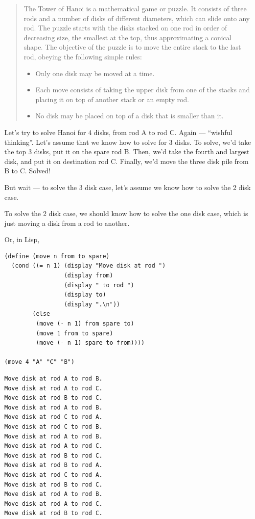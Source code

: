 \documentclass[9pt]{report}
\begin{document}
\begin{quote}
The Tower of Hanoi is a mathematical game or puzzle. It consists of
three rods and a number of disks of different diameters, which can
slide onto any rod. The puzzle starts with the disks stacked on one
rod in order of decreasing size, the smallest at the top, thus
approximating a conical shape. The objective of the puzzle is to
move the entire stack to the last rod, obeying the following simple
rules:

\begin{itemize}
\item Only one disk may be moved at a time.
\item Each move consists of taking the upper disk from one of the
stacks and placing it on top of another stack or an empty rod.
\item No disk may be placed on top of a disk that is smaller than it.
\end{itemize}
\end{quote}

Let's try to solve Hanoi for 4 disks, from rod A to rod C. Again
--- ``wishful thinking''. Let's assume that we know how to solve for
3 disks. To solve, we'd take the top 3 disks, put it on the spare
rod B. Then, we'd take the fourth and largest disk, and put it on
destination rod C. Finally, we'd move the three disk pile from B
to C. Solved!

But wait --- to solve the 3 disk case, let's assume we know how to
solve the 2 disk case.

To solve the 2 disk case, we should know how
to solve the one disk case, which is just moving a disk from a rod
to another.

Or, in Lisp,

\begin{verbatim}
(define (move n from to spare)
  (cond ((= n 1) (display "Move disk at rod ")
                 (display from)
                 (display " to rod ")
                 (display to)
                 (display ".\n"))
        (else
         (move (- n 1) from spare to)
         (move 1 from to spare)
         (move (- n 1) spare to from))))

(move 4 "A" "C" "B")
\end{verbatim}

\begin{verbatim}
Move disk at rod A to rod B.
Move disk at rod A to rod C.
Move disk at rod B to rod C.
Move disk at rod A to rod B.
Move disk at rod C to rod A.
Move disk at rod C to rod B.
Move disk at rod A to rod B.
Move disk at rod A to rod C.
Move disk at rod B to rod C.
Move disk at rod B to rod A.
Move disk at rod C to rod A.
Move disk at rod B to rod C.
Move disk at rod A to rod B.
Move disk at rod A to rod C.
Move disk at rod B to rod C.
\end{verbatim}
\end{document}

